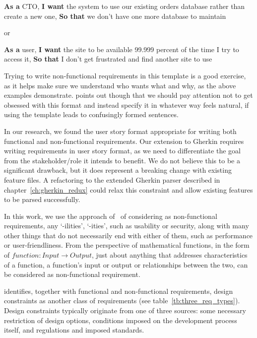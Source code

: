 \documentclass[dissertation,final]{softeng}
\newcommand{\nfrs}{non-functional requirements\xspace}
\begin{document}
\begin{displayquote}
\textbf{As a} CTO, \textbf{I want} the system to use our existing orders database rather than create a new one, \textbf{So that} we don't have one more database to maintain
\end{displayquote}

or

\begin{displayquote}
\textbf{As a} user, \textbf{I want} the site to be available 99.999 percent of the time I try to access it, \textbf{So that} I don't get frustrated and find another site to use
\end{displayquote}

Trying to write \nfrs in this template is a good exercise, as it helps make sure we understand who wants what and why, as the above examples demonstrate. \citet{CohnNFRS} points out though that we should pay attention not to get obsessed with this format and instead specify it in whatever way feels natural, if using the template leads to confusingly formed sentences.

In our research, we found the user story format appropriate for writing both functional and non-functional requirements. Our extension to Gherkin requires writing requirements in user story format, as we need to differentiate the goal from the stakeholder/role it intends to benefit. We do not believe this to be a significant drawback, but it does represent a breaking change with existing feature files. A refactoring to the extended Gherkin parser described in chapter~\ref{ch:gherkin_redux} could relax this constraint and allow existing features to be parsed successfully.

In this work, we use the approach of~\citet{Chung:2009vg} of considering as non-functional requirements, any `-ilities', `-ities', such as usability or security, along with many other things that do not necessarily end with either of them, such as performance or user-friendliness. From the perspective of mathematical functions, in the form of $\mathit{function} : \mathit{Input} \rightarrow \mathit{Output}$, just about anything that addresses characteristics of a function, a function's input or output or relationships between the two, can be considered as non-functional requirement.

\citet{Leffingwell2011} identifies, together with functional and non-functional requirements, design constraints as another class of requirements (see table~\ref{tb:three_req_types}). Design constraints typically originate from one of three sources: some necessary restriction of design options, conditions imposed on the development process itself, and regulations and imposed standards.
\end{document}
